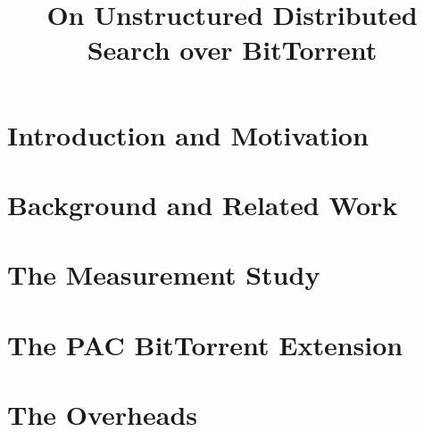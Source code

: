 \documentclass[10pt,peerreviewca]{IEEEtran}
\begin{document}
\title{On Unstructured Distributed Search over BitTorrent}

\author{
\and
{}
}

\maketitle

\begin{abstract}
    
    

\end{abstract}

\IEEEpeerreviewmaketitle

\section{Introduction and Motivation}\label{sec:introduction}

    

\section{Background and Related Work}\label{sec:background}

    

\section{The Measurement Study}\label{sec:measurement}

    

\section{The PAC BitTorrent Extension}\label{sec:extension}

    

\section{The Overheads}\label{sec:overheads}
\end{document}
